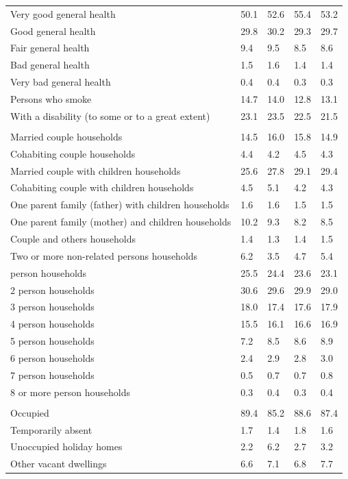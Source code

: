 \documentclass{article}
\begin{document}
\begin{table}[h]
\begin{tabular}{KTTTT}
    \hline
Very good general health & 50.1& 52.6&55.4& 53.2\\
Good general health & 29.8& 30.2& 29.3& 29.7\\
Fair general health & 9.4& 9.5&8.5& 8.6\\
Bad general health & 1.5& 1.6&1.4& 1.4\\
Very bad general health & 0.4& 0.4&0.3& 0.3\\
    \hline
Persons who smoke & 14.7& 14.0&12.8& 13.1\\
    \hline
With a disability (to some or to a great extent) & 23.1& 23.5&22.5& 21.5\\
\hline
    \\ 
    \hline
Married couple households & 14.5& 16.0& 15.8& 14.9\\
Cohabiting couple households & 4.4& 4.2& 4.5& 4.3\\
Married couple with children households & 25.6& 27.8& 29.1& 29.4\\
Cohabiting couple with children households & 4.5& 5.1& 4.2& 4.3\\
One parent family (father) with  children households & 1.6& 1.6& 1.5& 1.5\\
One parent family (mother) and children households & 10.2&  9.3&  8.2&  8.5\\
Couple and others households  & 1.4& 1.3& 1.4& 1.5\\
Two or more non-related persons households & 6.2& 3.5& 4.7& 5.4\\
     person households & 25.5& 24.4& 23.6& 23.1\\
2 person households & 30.6& 29.6& 29.9& 29.0\\
3 person households & 18.0& 17.4& 17.6& 17.9\\
4 person households & 15.5& 16.1& 16.6& 16.9\\
5 person households & 7.2& 8.5& 8.6& 8.9\\
6 person households & 2.4& 2.9& 2.8& 3.0\\
7 person households & 0.5& 0.7& 0.7& 0.8\\
8 or more person households & 0.3& 0.4& 0.3& 0.4\\
\hline
    \\ 
    \hline
Occupied & 89.4& 85.2& 88.6& 87.4\\
Temporarily absent & 1.7& 1.4& 1.8& 1.6\\
Unoccupied holiday homes & 2.2& 6.2& 2.7& 3.2\\
Other vacant dwellings & 6.6& 7.1& 6.8& 7.7\\
\hline
\end{tabular}
\end{table}
\end{document}
